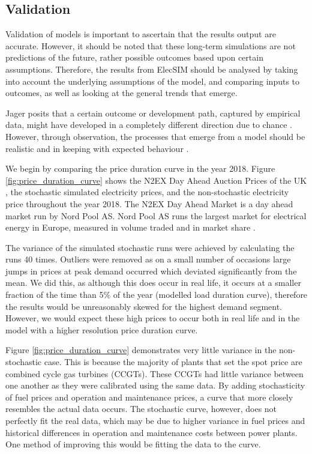 
\subsection{Validation} Validation of models is important to ascertain that the results output are accurate. However, it should be noted that these long-term simulations are not predictions of the future, rather possible outcomes based upon certain assumptions. Therefore, the results from ElecSIM should be analysed by taking into account the underlying assumptions of the model, and comparing inputs to outcomes, as well as looking at the general trends that emerge.

Jager posits that a certain outcome or development path, captured by empirical data, might have developed in a completely different direction due to chance \cite{Jager2006a}. However, through observation, the processes that emerge from a model should be realistic and in keeping with expected behaviour \cite{Jager2006}.

We begin by comparing the price duration curve in the year 2018. Figure \ref{fig:price_duration_curve} shows the N2EX Day Ahead Auction Prices of the UK \cite{nordpool_2019}, the stochastic simulated electricity prices, and the non-stochastic electricity price throughout the year 2018. The N2EX Day Ahead Market is a day ahead market run by Nord Pool AS. Nord Pool AS runs the largest market for electrical energy in Europe, measured in volume traded and in market share \cite{nordpool_2019}.

The variance of the simulated stochastic runs were achieved by calculating the runs 40 times. Outliers were removed as on a small number of occasions large jumps in prices at peak demand occurred which deviated significantly from the mean. We did this, as although this does occur in real life, it occurs at a smaller fraction of the time than 5\% of the year (modelled load duration curve), therefore the results would be unreasonably skewed for the highest demand segment. However, we would expect these high prices to occur both in real life and in the model with a higher resolution price duration curve.

Figure \ref{fig:price_duration_curve} demonstrates very little variance in the non-stochastic case. This is because the majority of plants that set the spot price are combined cycle gas turbines (CCGTs). These CCGTs had little variance between one another as they were calibrated using the same data. By adding stochasticity of fuel prices and operation and maintenance prices, a curve that more closely resembles the actual data occurs. The stochastic curve, however, does not perfectly fit the real data, which may be due to higher variance in fuel prices and historical differences in operation and maintenance costs between power plants. One method of improving this would be fitting the data to the curve.

